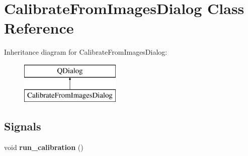 \hypertarget{class_calibrate_from_images_dialog}{}\section{Calibrate\+From\+Images\+Dialog Class Reference}
\label{class_calibrate_from_images_dialog}
Inheritance diagram for Calibrate\+From\+Images\+Dialog\+:\begin{figure}[H]
\begin{center}
\leavevmode
\includegraphics[height=2.000000cm]{class_calibrate_from_images_dialog}
\end{center}
\end{figure}
\subsection*{Signals}
\begin{DoxyCompactItemize}
\item 
\hypertarget{class_calibrate_from_images_dialog_a1733440fa386d1482cbf7dc2704c2612}{}void {\bfseries run\+\_\+calibration} ()\label{class_calibrate_from_images_dialog_a1733440fa386d1482cbf7dc2704c2612}

\end{DoxyCompactItemize}
